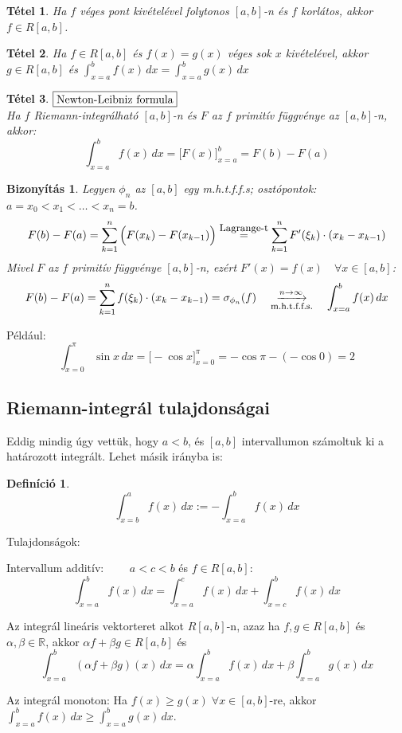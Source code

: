 \documentclass[a4paper,12pt,twoside]{book}
\newtheorem{tetel}{Tétel}[chapter]
\newtheorem{defi}{Definíció}[chapter]
\theoremstyle{break}
\newtheorem{biz}{Bizonyítás}[chapter]
\theoremstyle{plain}
\newcommand{\hatInteg}[3]{\ensuremath{\int^{#2}_{x=#1} #3\, dx}}
\begin{document}
\begin{tetel}
 Ha $f$ véges pont kivételével folytonos $[a,b]$-n és $f$ korlátos, akkor $f\in R[a,b]$.
\end{tetel}
\addtocounter{biz}{1}

\begin{tetel}
 Ha $f\in R[a,b]$ és $f(x)=g(x)$ véges sok $x$ kivételével, akkor $g\in R[a,b]$ és $\hatInteg{a}{b}{f(x)}=\hatInteg{a}{b}{g(x)}$
\end{tetel}
\addtocounter{biz}{1}

\begin{tetel} $\boxed{$Newton-Leibniz formula$}$\\[+2pt]
 Ha $f$ Riemann-integrálható $[a,b]$-n és $F$ az $f$ primitív függvénye az $[a,b]$-n, akkor:
  \[\hatInteg{a}{b}{f(x)} = \Big[F(x)\Big]^{b}_{x=a} = F(b)-F(a)\]
\end{tetel}
\begin{biz}
Legyen $\phi_n$ az $[a,b]$ egy m.h.t.f.f.s; osztópontok: $a=x_0<x_1<\ldots<x_n=b$.
 \[F(b)-F(a)= \sum^{n}_{k=1} \Big(F(x_k)-F(x_{k-1})\Big) \overset{\hbox{\small Lagrange-t}}{=} \sum^{n}_{k=1} F'(\xi_k)\cdot(x_k-x_{k-1})\]
 Mivel $F$ az $f$ primitív függvénye $[a,b]$-n, ezért $F'(x)=f(x) \quad \forall x\in[a,b]$:
 \[F(b)-F(a)=\sum^{n}_{k=1} f(\xi_k)\cdot(x_k-x_{k-1}) = \sigma_{\phi_n}(f) \quad \underset{\hbox{\footnotesize m.h.t.f.f.s.}}{\xrightarrow{n\to\infty}} \quad \hatInteg{a}{b}{f(x)}\]
\end{biz}

Például:
\[\hatInteg{0}{\pi}{\sin x} = \Big[-\cos x\Big]^{\pi}_{x=0} = -\cos \pi - (-\cos 0) = 2\]

\subsection{Riemann-integrál tulajdonságai}

Eddig mindig úgy vettük, hogy $a<b$, és $[a,b]$ intervallumon számoltuk ki a határozott integrált. Lehet másik irányba is:
\begin{defi}
 \[\hatInteg{b}{a}{f(x)} := -\hatInteg{a}{b}{f(x)}\]
\end{defi}

Tulajdonságok:
\begin{enumerate*}
 \item Intervallum additív: $\qquad a<c<b$ és $f\in R[a,b]$:
  \[\hatInteg{a}{b}{f(x)} = \hatInteg{a}{c}{f(x)}+\hatInteg{c}{b}{f(x)}\]
 \item Az integrál lineáris vektorteret alkot $R[a,b]$-n, azaz ha $f, g \in R[a,b]$ és $\alpha, \beta \in \mathbb{R}$, akkor $\alpha f+\beta g \in R[a,b]$ és
  \[\hatInteg{a}{b}{(\alpha f + \beta g)(x)} = \alpha\hatInteg{a}{b}{f(x)}+\beta\hatInteg{a}{b}{g(x)}\]
 \item Az integrál monoton: Ha $f(x) \geqslant g(x) \; \forall x\in [a,b]$-re, akkor $\hatInteg{a}{b}{f(x)} \geqslant \hatInteg{a}{b}{g(x)}$.
\end{enumerate*}
\end{document}
